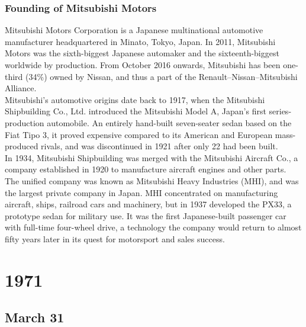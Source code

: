 \documentclass[11pt]{report}
\begin{document}
\subsection{Founding of Mitsubishi Motors}
Mitsubishi Motors Corporation is a Japanese multinational automotive manufacturer headquartered in Minato, Tokyo, Japan. In 2011, Mitsubishi Motors was the sixth-biggest Japanese automaker and the sixteenth-biggest worldwide by production. From October 2016 onwards, Mitsubishi has been one-third (34\%) owned by Nissan, and thus a part of the Renault–Nissan–Mitsubishi Alliance.\\
\indent Mitsubishi's automotive origins date back to 1917, when the Mitsubishi Shipbuilding Co., Ltd. introduced the Mitsubishi Model A, Japan's first series-production automobile. An entirely hand-built seven-seater sedan based on the Fiat Tipo 3, it proved expensive compared to its American and European mass-produced rivals, and was discontinued in 1921 after only 22 had been built.\\
\indent In 1934, Mitsubishi Shipbuilding was merged with the Mitsubishi Aircraft Co., a company established in 1920 to manufacture aircraft engines and other parts. The unified company was known as Mitsubishi Heavy Industries (MHI), and was the largest private company in Japan. MHI concentrated on manufacturing aircraft, ships, railroad cars and machinery, but in 1937 developed the PX33, a prototype sedan for military use. It was the first Japanese-built passenger car with full-time four-wheel drive, a technology the company would return to almost fifty years later in its quest for motorsport and sales success.

\chapter{1971}
\section{March 31}
\end{document}
